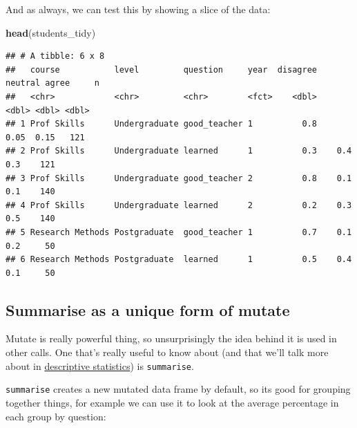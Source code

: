\documentclass[
]{book}
\newenvironment{Shaded}{\begin{snugshade}}{\end{snugshade}}
\newcommand{\DataTypeTok}[1]{\textcolor[rgb]{0.13,0.29,0.53}{#1}}
\newcommand{\KeywordTok}[1]{\textcolor[rgb]{0.13,0.29,0.53}{\textbf{#1}}}
\newcommand{\NormalTok}[1]{#1}
\newcommand{\OperatorTok}[1]{\textcolor[rgb]{0.81,0.36,0.00}{\textbf{#1}}}
\newcommand{\StringTok}[1]{\textcolor[rgb]{0.31,0.60,0.02}{#1}}
\begin{document}
And as always, we can test this by showing a slice of the data:

\begin{Shaded}
\begin{Highlighting}[]
\KeywordTok{head}\NormalTok{(students_tidy)}
\end{Highlighting}
\end{Shaded}

\begin{verbatim}
## # A tibble: 6 x 8
##   course           level         question     year  disagree neutral agree     n
##   <chr>            <chr>         <chr>        <fct>    <dbl>   <dbl> <dbl> <dbl>
## 1 Prof Skills      Undergraduate good_teacher 1          0.8    0.05  0.15   121
## 2 Prof Skills      Undergraduate learned      1          0.3    0.4   0.3    121
## 3 Prof Skills      Undergraduate good_teacher 2          0.8    0.1   0.1    140
## 4 Prof Skills      Undergraduate learned      2          0.2    0.3   0.5    140
## 5 Research Methods Postgraduate  good_teacher 1          0.7    0.1   0.2     50
## 6 Research Methods Postgraduate  learned      1          0.5    0.4   0.1     50
\end{verbatim}

\hypertarget{tidy_summ}{%
\subsection{Summarise as a unique form of mutate}\label{tidy_summ}}

Mutate is really powerful thing, so unsurprisingly the idea behind it is used in other calls. One that's really useful to know about (and that we'll talk more about in \protect\hyperlink{descstats}{descriptive statistics}) is \texttt{summarise}.

\texttt{summarise} creates a new mutated data frame by default, so its good for grouping together things, for example we can use it to look at the average percentage in each group by question:

\begin{Shaded}
\end{Shaded}
\end{document}

